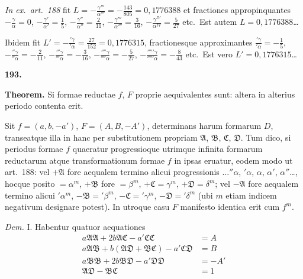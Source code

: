 \documentclass[12pt,a4paper]{article}
\theoremstyle{plain}
\begin{document}
\textit{In ex.~art.~188} fit $L = -\frac{\gamma'''}{\alpha'''} = -\frac{143}{805} = 0{,}1776388$ et fractiones appropinquantes $-\frac{\gamma}{\alpha} = 0$, $-\frac{\gamma'}{\alpha'} = \frac{1}{5}$, $-\frac{\gamma''}{\alpha''} = \frac{2}{11}$, $-\frac{\gamma'''}{\alpha'''} = \frac{3}{16}$, $-\frac{\gamma^{IV}}{\alpha^{IV}} = \frac{5}{27}$ etc.~Est autem $L = 0{,}1776388$\ldots

Ibidem fit $L' = -\frac{'\gamma}{'\alpha} = \frac{27}{152} = 0{,}1776315$, fractionesque approximantes $\frac{'\gamma}{'\alpha} = -\frac{1}{5}$, $-\frac{''\gamma}{''\alpha} = -\frac{2}{11}$, $-\frac{'''\gamma}{'''\alpha} = -\frac{3}{16}$, $-\frac{''''\gamma}{''''\alpha} = -\frac{5}{27}$, $-\frac{'''''\gamma}{'''''\alpha} = -\frac{8}{43}$ etc.~Est vero $L' = 0{,}1776315$\ldots

\bigskip

\textbf{193.}

\textbf{Theorem.} Si formae reductae $f$, $F$ proprie aequivalentes sunt: altera in alterius periodo contenta erit.

Sit $f = (a, b, -a')$, $F = (A, B, -A')$, determinans harum formarum $D$, transeatque illa in hanc per substitutionem propriam $\mathfrak{A}$, $\mathfrak{B}$, $\mathfrak{C}$, $\mathfrak{D}$. Tum dico, si periodus formae $f$ quaeratur progressioque utrimque infinita formarum reductarum atque transformationum formae $f$ in ipsas eruatur, eodem modo ut art.~188: vel $+\mathfrak{A}$ fore aequalem termino alicui progressionis $\ldots''\alpha$, $'\alpha$, $\alpha$, $\alpha'$, $\alpha''$\ldots, hocque posito $= \alpha^m$, $+\mathfrak{B}$ fore $= \beta^m$, $+\mathfrak{C} = \gamma^m$, $+\mathfrak{D} = \delta^m$; vel $-\mathfrak{A}$ fore aequalem termino alicui $'\alpha^m$, $-\mathfrak{B} = '\beta^m$, $-\mathfrak{C} = '\gamma^m$, $-\mathfrak{D} = '\delta^m$ (ubi $m$ etiam indicem negativum designare potest). In utroque casu $F$ manifesto identica erit cum $f^m$.

\textit{Dem.} I. Habentur quatuor aequationes
\begin{align*}
a\mathfrak{A}\mathfrak{A} + 2b\mathfrak{A}\mathfrak{C} - a'\mathfrak{C}\mathfrak{C} &= A \tag{1}\\
a\mathfrak{A}\mathfrak{B} + b(\mathfrak{A}\mathfrak{D} + \mathfrak{B}\mathfrak{C}) - a'\mathfrak{C}\mathfrak{D} &= B \tag{2}\\
a\mathfrak{B}\mathfrak{B} + 2b\mathfrak{B}\mathfrak{D} - a'\mathfrak{D}\mathfrak{D} &= -A' \tag{3}\\
\mathfrak{A}\mathfrak{D} - \mathfrak{B}\mathfrak{C} &= 1 \tag{4}
\end{align*}
\end{document}

